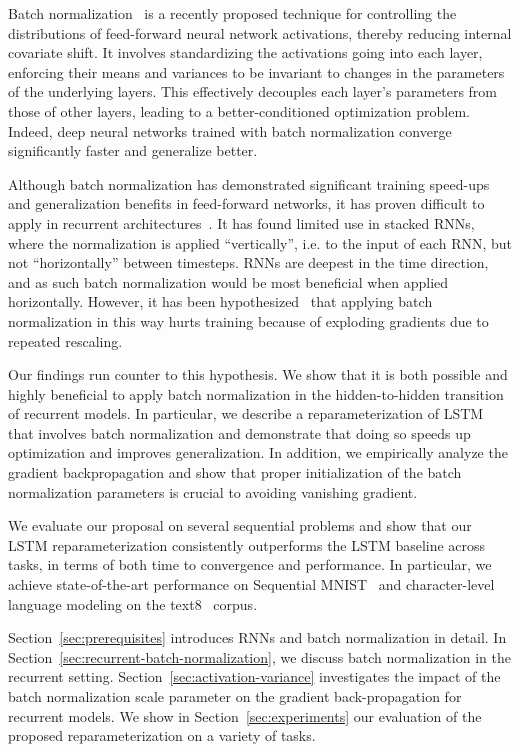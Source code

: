 \documentclass{article} %
\begin{document}
Batch normalization~\cite{batchnorm} is a recently proposed technique for controlling the distributions of feed-forward neural network activations, thereby reducing internal covariate shift.
It involves standardizing the activations going into each layer, enforcing their means and variances to be invariant to changes in the parameters of the underlying layers.
This effectively decouples each layer's parameters from those of other layers, leading to a better-conditioned optimization problem.
Indeed, deep neural networks trained with batch normalization converge significantly faster and generalize better.

Although batch normalization has demonstrated significant training speed-ups and generalization benefits in feed-forward networks,
it has proven difficult to apply in recurrent architectures~\cite{cesar,baidu}.
It has found limited use in stacked RNNs, where the normalization is applied ``vertically'',
i.e. to the input of each RNN, but not ``horizontally'' between timesteps.
RNNs are deepest in the time direction, and as such batch normalization would be most beneficial when applied horizontally.
However, it has been hypothesized~\cite{cesar} that applying batch normalization in this way hurts training
because of exploding gradients due to repeated rescaling.

Our findings run counter to this hypothesis.
We show that it is both possible and highly beneficial to apply batch normalization in the hidden-to-hidden transition of recurrent models.
In particular, we describe a reparameterization of LSTM that involves batch normalization
and demonstrate that doing so speeds up optimization and improves generalization.
In addition, we empirically analyze the gradient backpropagation and show that proper initialization
of the batch normalization parameters is crucial to avoiding vanishing gradient.

We evaluate our proposal on several sequential problems and show that our
LSTM reparameterization consistently outperforms the LSTM baseline across tasks,
in terms of both time to convergence and performance.
In particular, we achieve state-of-the-art performance on
Sequential MNIST~\cite{le2015simple} and
character-level language modeling on the text8~\cite{mahoney2009large} corpus.

Section~\ref{sec:prerequisites} introduces RNNs and batch normalization in detail.
In Section~\ref{sec:recurrent-batch-normalization}, we discuss batch normalization in the recurrent setting.
Section~\ref{sec:activation-variance} investigates the impact of the batch normalization scale parameter on the gradient back-propagation for
recurrent models. We show in Section~\ref{sec:experiments} our evaluation
of the proposed reparameterization on a variety of tasks.
\end{document}
